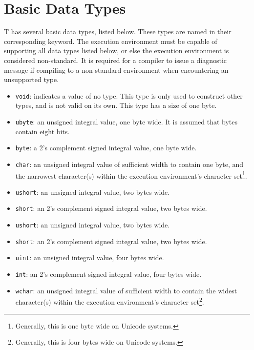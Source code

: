 \documentclass[letterpaper,12pt]{book}
\begin{document}
\section{Basic Data Types}

T has several basic data types, listed below. These types are named in their corresponding keyword. The execution environment must be capable of supporting all data types listed below, or else the execution environment is considered non-standard. It is required for a compiler to issue a diagnostic message if compiling to a non-standard environment when encountering an unsupported type.

\begin{itemize}
	\item \texttt{void}: indicates a value of no type. This type is only used to construct other types, and is not valid on its own. This type has a size of one byte.
	
	\item \texttt{ubyte}: an unsigned integral value, one byte wide. It is assumed that bytes contain eight bits.
	
	\item \texttt{byte}: a 2's complement signed integral value, one byte wide.
	
	\item \texttt{char}: an unsigned integral value of sufficient width to contain one byte, and the narrowest character(s) within the execution environment's character set\footnote{Generally, this is one byte wide on Unicode systems.}.
	
	\item \texttt{ushort}: an unsigned integral value, two bytes wide.
	
	\item \texttt{short}: an 2's complement signed integral value, two bytes wide.
	
	\item \texttt{ushort}: an unsigned integral value, two bytes wide.
	
	\item \texttt{short}: an 2's complement signed integral value, two bytes wide.
	
	\item \texttt{uint}: an unsigned integral value, four bytes wide.
	
	\item \texttt{int}: an 2's complement signed integral value, four bytes wide.
	
	\item \texttt{wchar}: an unsigned integral value of sufficient width to contain the widest character(s) within the execution environment's character set\footnote{Generally, this is four bytes wide on Unicode systems.}.
	

\end{itemize}
\end{document}
